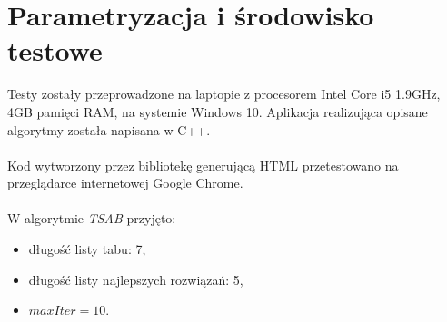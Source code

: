 \documentclass[printmode,oneside]{mgr}
\begin{document}
\section{Parametryzacja i środowisko testowe}
Testy zostały przeprowadzone na laptopie z procesorem Intel Core i5 1.9GHz, 4GB pamięci RAM, na systemie Windows 10. Aplikacja realizująca opisane algorytmy została napisana w C++.\\\\
Kod wytworzony przez bibliotekę generującą HTML przetestowano na przeglądarce internetowej Google Chrome.\\\\
W algorytmie \emph{TSAB} przyjęto:
\begin{itemize}
 	\item długość listy tabu: 7,
 	\item długość listy najlepszych rozwiązań: 5,
 	\item $maxIter = 10$.
\end{itemize}
%
\end{document}
